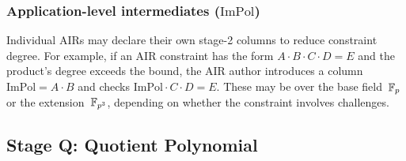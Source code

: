 \subsubsection*{Application-level intermediates ($\mathrm{ImPol}$)}

Individual AIRs may declare their own stage-2 columns to reduce
constraint degree.
For example, if an AIR constraint has the form
$A \cdot B \cdot C \cdot D = E$
and the product's degree exceeds the bound,
the AIR author introduces a column $\mathrm{ImPol} = A \cdot B$
and checks $\mathrm{ImPol} \cdot C \cdot D = E$.
These may be over the base field~$\mathbb{F}_p$ or the extension~$\mathbb{F}_{p^3}$,
depending on whether the constraint involves challenges.

\subsection{Stage Q: Quotient Polynomial}
\label{sec:stageQ}

